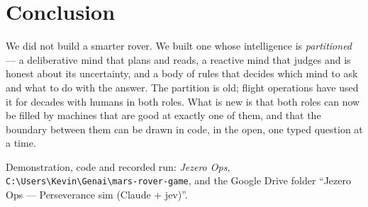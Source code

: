 \documentclass[11pt]{article}
\begin{document}
\section{Conclusion}
We did not build a smarter rover. We built one whose intelligence is \emph{partitioned} --- a deliberative mind that plans and reads, a reactive mind that judges and is honest about its uncertainty, and a body of rules that decides which mind to ask and what to do with the answer. The partition is old; flight operations have used it for decades with humans in both roles. What is new is that both roles can now be filled by machines that are good at exactly one of them, and that the boundary between them can be drawn in code, in the open, one typed question at a time.

\vspace{1em}\noindent\small Demonstration, code and recorded run: \emph{Jezero Ops}, \texttt{C:\textbackslash Users\textbackslash Kevin\textbackslash Genai\textbackslash mars-rover-game}, and the Google Drive folder ``Jezero Ops --- Perseverance sim (Claude + jev)''.
\end{document}
